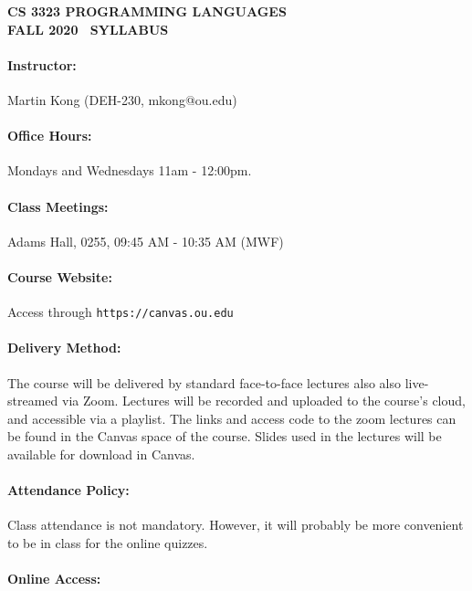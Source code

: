 \documentclass[11pt, epsfig]{article}
\newcommand{\courseterm}[0]{FALL 2020}
\begin{document}
\begin{center}
{\Large\bf CS 3323 PROGRAMMING LANGUAGES\\
  \courseterm~ SYLLABUS}
\end{center}

\paragraph{Instructor:} Martin Kong (DEH-230,  mkong@ou.edu)

\paragraph{Office Hours:} Mondays and Wednesdays 11am - 12:00pm.


\paragraph{Class Meetings:} Adams Hall, 0255, 09:45 AM - 10:35 AM (MWF)

\paragraph{Course Website:} Access through \texttt{https://canvas.ou.edu} 

\paragraph{Delivery Method:}
The course will be delivered by standard face-to-face lectures 
also also live-streamed via Zoom. Lectures will be recorded and uploaded to
the course's cloud, and accessible via a playlist. The links and
access code to the zoom lectures can be found in the Canvas space of the course.
Slides used in the lectures will be available for download in Canvas.

\paragraph{Attendance Policy:}
Class attendance is not mandatory. However, it will probably be more convenient
to be in class for the online quizzes.

\paragraph{Online Access:}
\end{document}
